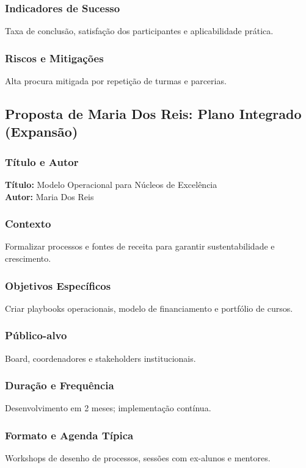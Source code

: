 \documentclass[12pt,a4paper]{article}
\begin{document}
\subsubsection*{Indicadores de Sucesso}
Taxa de conclusão, satisfação dos participantes e aplicabilidade prática.

\subsubsection*{Riscos e Mitigações}
Alta procura mitigada por repetição de turmas e parcerias.

\subsection{Proposta de Maria Dos Reis: Plano Integrado (Expansão)}

\subsubsection*{Título e Autor}
\textbf{Título:} Modelo Operacional para Núcleos de Excelência \\
\textbf{Autor:} Maria Dos Reis

\subsubsection*{Contexto}
Formalizar processos e fontes de receita para garantir sustentabilidade e crescimento.

\subsubsection*{Objetivos Específicos}
Criar playbooks operacionais, modelo de financiamento e portfólio de cursos.

\subsubsection*{Público-alvo}
Board, coordenadores e stakeholders institucionais.

\subsubsection*{Duração e Frequência}
Desenvolvimento em 2 meses; implementação contínua.

\subsubsection*{Formato e Agenda Típica}
Workshops de desenho de processos, sessões com ex-alunos e mentores.
\end{document}
